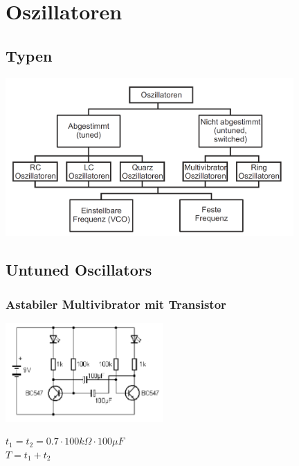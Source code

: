 \section{Oszillatoren}
\subsection{Typen}
	\begin{center}
		\includegraphics[width=11cm]{images/osziTypen.png}
	\end{center}

\subsection{Untuned Oscillators}
	\subsubsection{Astabiler Multivibrator mit Transistor}
	\begin{minipage}{6cm}
		\includegraphics[width=6cm]{images/multiVibrator}
	\end{minipage}
	\begin{minipage}{10cm}
		$t_1 = t_2 = 0.7 \cdot 100k\Omega \cdot 100\mu F$ \\
		$T = t_1 + t_2$
	\end{minipage}

